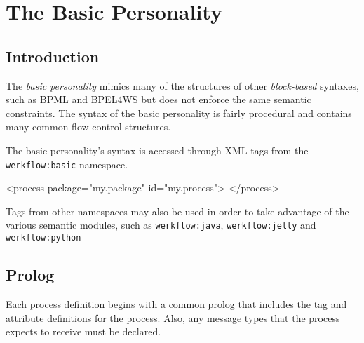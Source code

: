 
\chapter{The Basic Personality}


\section{Introduction}

The \emph{basic personality} mimics many of the structures
of other \emph{block-based} syntaxes, such as BPML and BPEL4WS
but does not enforce the same semantic constraints.  The syntax of
the basic personality is fairly procedural and contains many common
flow-control structures.

The basic personality's syntax is accessed through XML tags from
the \verb|werkflow:basic| namespace.

\begin{codelisting}
<process 
         package="my.package"
         id="my.process">
</process>
\end{codelisting}

Tags from other namespaces may also be used in order to 
take advantage of the various semantic modules, such
as \verb|werkflow:java|, \verb|werkflow:jelly| and 
\verb|werkflow:python|


\section{Prolog}

Each process definition begins with a common prolog that includes
the  tag and attribute definitions for the process.
Also, any message types that the process expects to receive must
be declared.

\subsection{}

